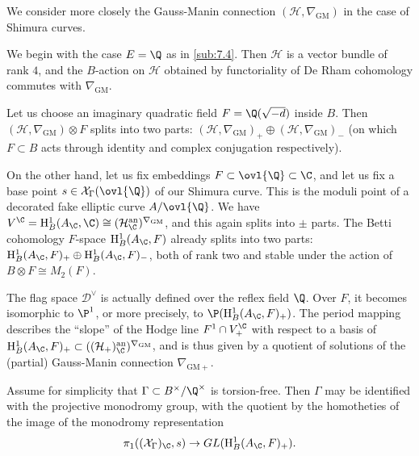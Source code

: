 \begin{para}\label{para:7.6.1}
 We consider more closely the Gauss-Manin connection
 $(\mathcal{H},\nabla_{\mathrm{GM}})$ in the case of Shimura curves.


 We begin with the case $E=\Q$ as in \ref{sub:7.4}.  Then $\mathcal{H}$
 is a vector bundle of rank $4$, and the $B$-action on $\mathcal{H}$
 obtained by functoriality of De Rham cohomology commutes with
 $\nabla_{\mathrm{GM}}$.

 Let us choose an imaginary quadratic field $F=\Q(\sqrt{-d})$ inside
 $B$. Then $(\mathcal{H},\nabla_{\mathrm{GM}})\otimes F$ splits into two parts:
 $(\mathcal{H},\nabla_{\mathrm{GM}})_+\oplus
 (\mathcal{H},\nabla_{\mathrm{GM}})_{-}$ (on 
 which $F\subset B$ acts through identity and complex conjugation
 respectively).


 On the other hand, let us fix embeddings $F\subset \ovl{\Q} \subset \C$,
 and let us fix a base point $s\in \mathcal{X}_{\Gamma}(\ovl{\Q})$ of our
 Shimura curve.  This is the moduli point of a decorated fake elliptic
 curve $A/\ovl{\Q}$. We have $V^\C=\mathrm{H}^1_B(A_\C,\C)\cong
 (\mathcal{H}_\C^{\mathrm{an}})^{\nabla_{\mathrm{GM}}}$, and this again splits
 into $\pm$ parts. The Betti cohomology $F$-space
 $\mathrm{H}^1_B(A_\C,F)$ already splits into two parts:
 $\mathrm{H}^1_B(A_\C,F)_+\oplus \mathrm{H}^1_B(A_\C,F)_{-}$, both of
 rank two and stable under the action of $B\otimes F \cong M_2(F)$.

 The flag space $\mathcal{D}^\vee$ is actually defined over the reflex
 field $\Q$. Over $F$, it becomes isomorphic to $\P^1$, or more
 precisely, to $\P(\mathrm{H}^1_B(A_\C,F)_+)$. The period mapping describes the
 ``slope'' of the Hodge line $F^1\cap V^\C_+$ with respect to a basis of
 $\mathrm{H}^1_B(A_\C,F)_+\subset
 ((\mathcal{H}_+)_\C^{\mathrm{an}})^{\nabla_{\mathrm{GM}}}$, and is 
 thus given by a quotient of solutions of the (partial) Gauss-Manin
 connection $\nabla_{\mathrm{GM}+}$.


 Assume for simplicity that $\Gamma\subset B^\times/\Q^\times$ is
 torsion-free. Then $\Gamma$ may be identified with the projective
 monodromy group, \ie with the quotient by the homotheties of the image
 of the monodromy representation
 \begin{equation*}
  \pi_1((\mathcal{X}_{\Gamma })_\C,s)\rightarrow GL(\mathrm{H}^1_B(A_\C,F)_+).
 \end{equation*}


\end{para}

